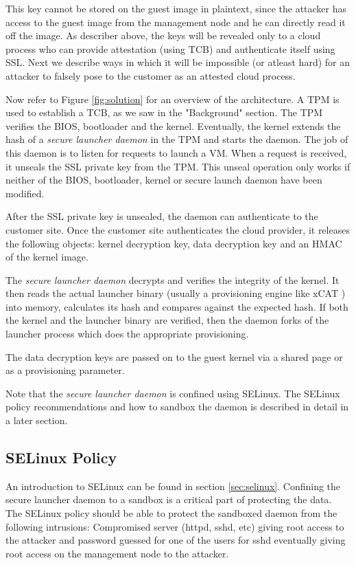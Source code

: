 \documentclass[10pt,twocolumn,pdftex]{article}
\begin{document}
This key cannot be stored on the guest image in plaintext, since the attacker has access to the guest image from the management node and he can directly read it off the image. As describer above, the keys will be revealed only to a cloud process who can provide attestation (using TCB) and authenticate itself using SSL. Next we describe ways in which it will be impossible (or atleast hard) for an attacker to falsely pose to the customer as an attested cloud process.

Now refer to Figure \ref{fig:solution} for an overview of the architecture.
A TPM is used to establish a TCB, as we saw in the "Background" section. The TPM verifies the BIOS, bootloader and the kernel. Eventually, the kernel extends the hash of a \emph{secure launcher daemon} in the TPM and starts the daemon. The job of this daemon is to listen for requests to launch a VM. When a request is received, it unseals the SSL private key from the TPM. This unseal operation only works if neither of the BIOS, bootloader, kernel or secure launch daemon have been modified.

After the SSL private key is unsealed, the daemon can authenticate to the customer site. Once the customer site authenticates the cloud provider, it releases the following objects: kernel decryption key, data decryption key and an HMAC of the kernel image.

The \emph{secure launcher daemon} decrypts and verifies the integrity of the kernel. It then reads the actual launcher binary (usually a provisioning engine like xCAT \cite{xCAT}) into memory, calculates its hash and compares against the expected hash. If both the kernel and the launcher binary are verified, then the daemon forks of the launcher process which does the appropriate provisioning.

The data decryption keys are passed on to the guest kernel via a shared page or as a provisioning parameter.

Note that the \emph{secure launcher daemon} is confined using SELinux. The SELinux policy recommendations and how to sandbox the daemon is described in detail in a later section.

\subsection{SELinux Policy}
An introduction to SELinux can be found in section \ref{sec:selinux}. Confining the secure launcher daemon to a sandbox is a critical part of protecting the data. The SELinux policy should be able to protect the sandboxed daemon from the following intrusions: Compromised server (httpd, sshd, etc) giving root access to the attacker and password guessed for one of the users for sshd eventually giving root access on the management node to the attacker. 
\end{document}
